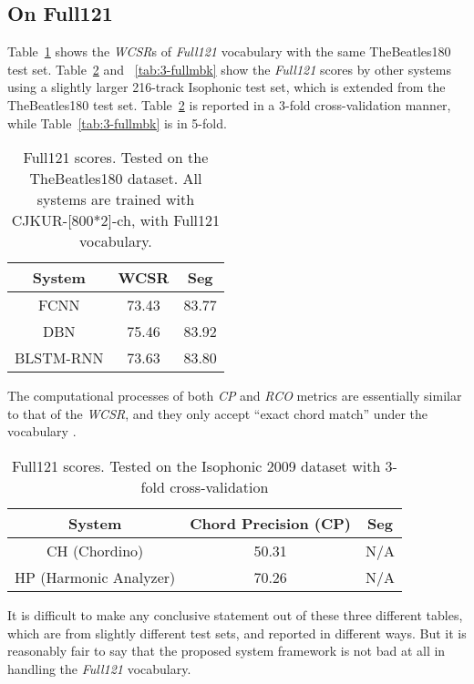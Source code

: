 \subsection{On Full121}
Table~\ref{tab:3-full} shows the \textit{WCSR}s of \textit{Full121} vocabulary with the same TheBeatles180 test set. Table~\ref{tab:3-fullhp} and ~\ref{tab:3-fullmbk} show the \textit{Full121} scores by other systems using a slightly larger 216-track Isophonic test set, which is extended from the TheBeatles180 test set. Table~\ref{tab:3-fullhp} is reported in a 3-fold cross-validation manner, while Table~\ref{tab:3-fullmbk} is in 5-fold.
\begin{table}[h]
\footnotesize
\centering
\caption{Full121 scores. Tested on the TheBeatles180 dataset. All systems are trained with CJKUR-[800*2]-ch, with Full121 vocabulary.}
\label{tab:3-full}
\begin{tabular}{|c|c|c|}\hline
System & WCSR & Seg \\ \hline
FCNN & 73.43 & 83.77 \\ \hline
DBN & 75.46 & 83.92 \\ \hline
BLSTM-RNN & 73.63 & 83.80 \\ \hline
\end{tabular}
\end{table}

The computational processes of both \textit{CP} and \textit{RCO} metrics are essentially similar to that of the \textit{WCSR}, and they only accept ``exact chord match'' under the vocabulary \cite{ni2012end,mauch2010automatic}.
\begin{table}[h]
\footnotesize
\centering
\caption{Full121 scores. Tested on the Isophonic 2009 dataset with 3-fold cross-validation\cite{ni2012end}}
\label{tab:3-fullhp}
\begin{tabular}{|c|c|c|}\hline
System & Chord Precision (CP) & Seg \\ \hline
CH (Chordino) & 50.31 & N/A \\ \hline
HP (Harmonic Analyzer) & 70.26 & N/A\\ \hline
\end{tabular}
\end{table}

It is difficult to make any conclusive statement out of these three different tables, which are from slightly different test sets, and reported in different ways. But it is reasonably fair to say that the proposed system framework is not bad at all in handling the \textit{Full121} vocabulary.

